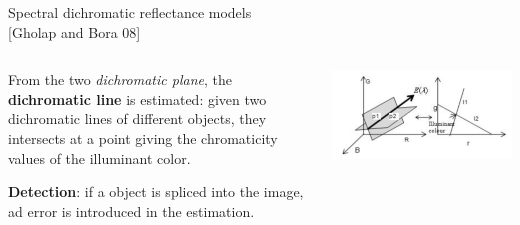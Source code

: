 \begin{tframe}{Spectral dichromatic reflectance models\\{\small [Gholap and Bora 08]}}
\vspace{0.1cm}
\begin{minipage}{\textwidth}
\begin{columns}[T]
\begin{column}{0.5\textwidth}
\vspace{0.4cm}
From the two \emph{dichromatic plane}, the \textbf{dichromatic line} is estimated: given two dichromatic lines of different objects, they intersects at a point giving the chromaticity values of the illuminant color. 

\vspace{1.1cm}

\textbf{Detection}: if a object is spliced into the image, ad error is introduced in the estimation.
\end{column}
\begin{column}{0.4\textwidth}
\centering
\vspace{1cm}

\includegraphics[width=\textwidth]{images/dichromatic-plane.jpg}
\end{column}
\end{columns}
\end{minipage}

\end{tframe}



